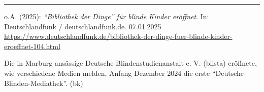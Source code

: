 \documentclass[a4paper,
fontsize=11pt,
oneside,
numbers=noperiodatend,
parskip=half-,
bibliography=totoc,
final
]{scrartcl}
\begin{document}
\begin{center}\rule{0.5\linewidth}{0.5pt}\end{center}

o.A. (2025): \emph{\enquote{Bibliothek der Dinge} für blinde Kinder
eröffnet}. In: Deutschlandfunk / deutschlandfunk.de. 07.01.2025
\url{https://www.deutschlandfunk.de/bibliothek-der-dinge-fuer-blinde-kinder-eroeffnet-104.html}

Die in Marburg ansässige Deutsche Blindenstudienanstalt e. V. (blista)
eröffnete, wie verschiedene Medien melden, Anfang Dezember 2024 die
erste \enquote{Deutsche Blinden-Mediathek}. (bk)

\end{document}

